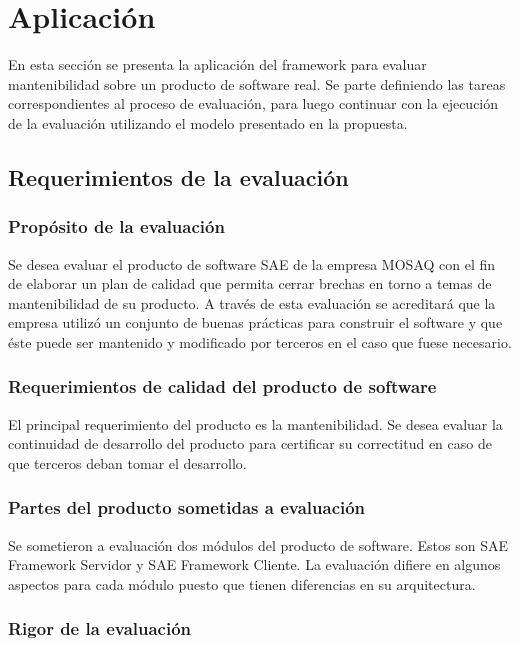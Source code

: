 \chapter{Aplicación}
\label{chap:aplicacion}
En esta sección se presenta la aplicación del framework para evaluar mantenibilidad
sobre un producto de software real. Se parte definiendo las tareas correspondientes
al proceso de evaluación, para luego continuar con la ejecución de la evaluación
utilizando el modelo presentado en la propuesta.

\section{Requerimientos de la evaluación}

\subsection{Propósito de la evaluación}

Se desea evaluar el producto de software SAE de la empresa MOSAQ con el fin de
elaborar un plan de calidad que permita cerrar brechas en torno a temas de
mantenibilidad de su producto. A través de esta evaluación se acreditará que la
empresa utilizó un conjunto de buenas prácticas para construir el software y que
éste puede ser mantenido y modificado por terceros en el caso que fuese necesario.

\subsection{Requerimientos de calidad del producto de software}

El principal requerimiento del producto es la mantenibilidad. Se desea evaluar
la continuidad de desarrollo del producto para certificar su correctitud
en caso de que terceros deban tomar el desarrollo.

\subsection{Partes del producto sometidas a evaluación}

Se sometieron a evaluación dos módulos del producto de software. Estos son SAE Framework
Servidor y SAE Framework Cliente. La evaluación difiere en algunos aspectos para cada módulo
puesto que tienen diferencias en su arquitectura.

\subsection{Rigor de la evaluación}

